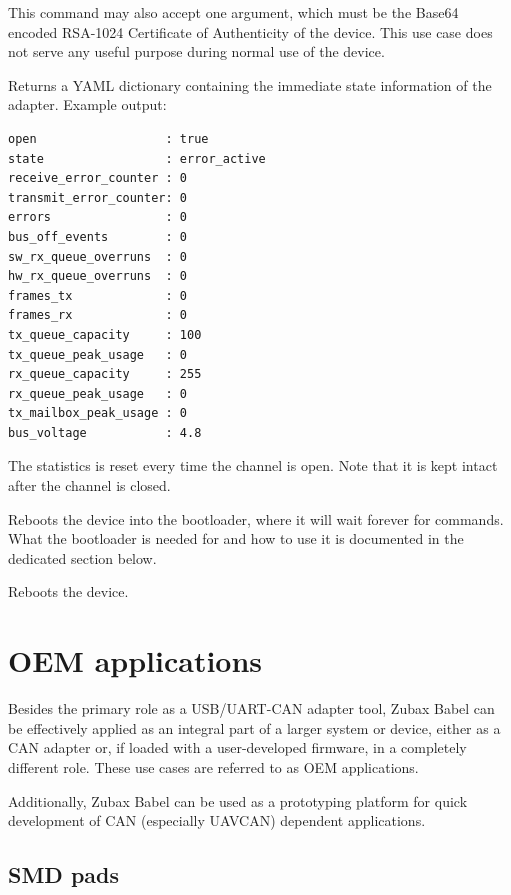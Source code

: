 \documentclass{zubaxdoc}
\begin{document}
This command may also accept one argument, which must be the Base64 encoded RSA-1024 Certificate of Authenticity of the device. This use case does not serve any useful purpose during normal use of the device.
\clearpage


Returns a YAML dictionary containing the immediate state information of the adapter. Example output:

\begin{verbatim}
open                  : true
state                 : error_active
receive_error_counter : 0
transmit_error_counter: 0
errors                : 0
bus_off_events        : 0
sw_rx_queue_overruns  : 0
hw_rx_queue_overruns  : 0
frames_tx             : 0
frames_rx             : 0
tx_queue_capacity     : 100
tx_queue_peak_usage   : 0
rx_queue_capacity     : 255
rx_queue_peak_usage   : 0
tx_mailbox_peak_usage : 0
bus_voltage           : 4.8
\end{verbatim}

The statistics is reset every time the channel is open. Note that it is kept intact after the channel is closed.


Reboots the device into the bootloader, where it will wait forever for commands. What the bootloader is needed for and how to use it is documented in the dedicated section below.


Reboots the device.

\chapter{OEM applications}\label{sec:oem_applications}

Besides the primary role as a USB/UART-CAN adapter tool, Zubax Babel can be effectively applied as an integral part of a larger system or device, either as a CAN adapter or, if loaded with a user-developed firmware, in a completely different role. These use cases are referred to as OEM applications.

Additionally, Zubax Babel can be used as a prototyping platform for quick development of CAN (especially UAVCAN) dependent applications.

\section{SMD pads}
\end{document}
